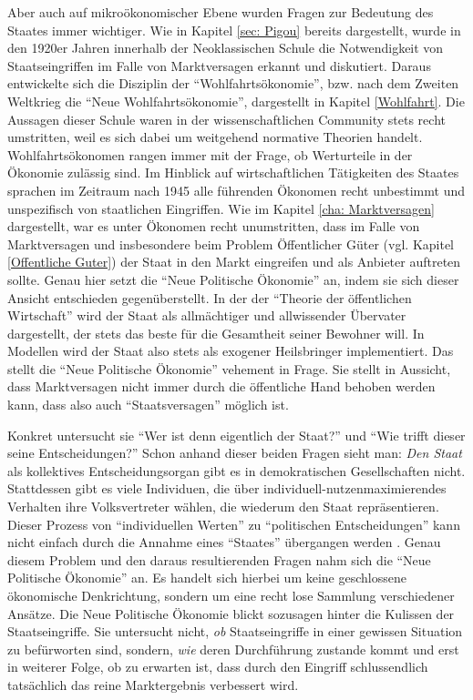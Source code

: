 Aber auch auf mikroökonomischer Ebene wurden Fragen zur Bedeutung des Staates immer wichtiger. Wie in Kapitel \ref{sec: Pigou} bereits dargestellt, wurde in den 1920er Jahren innerhalb der Neoklassischen Schule die Notwendigkeit von Staatseingriffen im Falle von Marktversagen erkannt und diskutiert. Daraus entwickelte sich die Disziplin der "`Wohlfahrtsökonomie"', bzw. nach dem Zweiten Weltkrieg die "`Neue Wohlfahrtsökonomie"', dargestellt in Kapitel \ref{Wohlfahrt}. Die Aussagen dieser Schule waren in der wissenschaftlichen Community stets recht umstritten, weil es sich dabei um weitgehend normative Theorien handelt. Wohlfahrtsökonomen rangen immer mit der Frage, ob Werturteile in der Ökonomie zulässig sind. Im Hinblick auf wirtschaftlichen Tätigkeiten des Staates sprachen im Zeitraum nach 1945 alle führenden Ökonomen recht unbestimmt und unspezifisch von staatlichen Eingriffen. Wie im Kapitel \ref{cha: Marktversagen} dargestellt, war es unter Ökonomen recht unumstritten, dass im Falle von Marktversagen und insbesondere beim Problem Öffentlicher Güter (vgl. Kapitel \ref{Offentliche Guter}) der Staat in den Markt eingreifen und als Anbieter auftreten sollte. Genau hier setzt die "`Neue Politische Ökonomie"' an, indem sie sich dieser Ansicht entschieden gegenüberstellt. In der der "`Theorie der öffentlichen Wirtschaft"' wird der Staat als allmächtiger und allwissender Übervater dargestellt, der stets das beste für die Gesamtheit seiner Bewohner will. In Modellen wird der Staat also stets als exogener Heilsbringer implementiert. Das stellt die "`Neue Politische Ökonomie"' vehement in Frage. Sie stellt in Aussicht, dass Marktversagen nicht immer durch die öffentliche Hand behoben werden kann, dass also auch "`Staatsversagen"' möglich ist.

Konkret untersucht sie "`Wer ist denn eigentlich der Staat?"' und "`Wie trifft dieser seine Entscheidungen?"' Schon anhand dieser beiden Fragen sieht man: \textit{Den Staat} als kollektives Entscheidungsorgan gibt es in demokratischen Gesellschaften nicht. Stattdessen gibt es viele Individuen, die über individuell-nutzenmaximierendes Verhalten ihre Volksvertreter wählen, die wiederum den Staat repräsentieren. Dieser Prozess von "`individuellen Werten"' zu "`politischen Entscheidungen"' kann nicht einfach durch die Annahme eines "`Staates"' übergangen werden \parencite[S. 11]{Buchanan1962}. Genau diesem Problem und den daraus resultierenden Fragen nahm sich die "`Neue Politische Ökonomie"' an. Es handelt sich hierbei um keine geschlossene ökonomische Denkrichtung, sondern um eine recht lose Sammlung verschiedener Ansätze. Die Neue Politische Ökonomie blickt sozusagen hinter die Kulissen der Staatseingriffe. Sie untersucht nicht, \textit{ob} Staatseingriffe in einer gewissen Situation zu befürworten sind, sondern, \textit{wie} deren Durchführung zustande kommt und erst in weiterer Folge, ob zu erwarten ist, dass durch den Eingriff schlussendlich tatsächlich das reine Marktergebnis verbessert wird.

